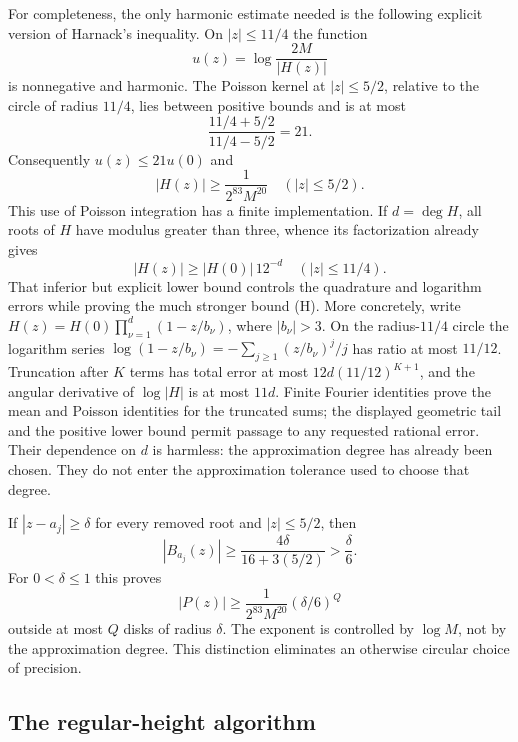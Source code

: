For completeness, the only harmonic estimate needed is the following
explicit version of Harnack's inequality.  On $|z|\le11/4$ the function
\[
 u(z)=\log\frac{2M}{|H(z)|}
\]
is nonnegative and harmonic.  The Poisson kernel at $|z|\le5/2$, relative to
the circle of radius $11/4$, lies between positive bounds and is at most
\[
 \frac{11/4+5/2}{11/4-5/2}=21.
\]
Consequently $u(z)\le21u(0)$ and
\[
 |H(z)|\ge \frac{1}{2^{83}M^{20}}\quad(|z|\le5/2).       \tag{H}
\]
This use of Poisson integration has a finite implementation.  If $d=\deg H$,
all roots of $H$ have modulus greater than three, whence its factorization
already gives
\[
 |H(z)|\ge |H(0)|\,12^{-d}\quad (|z|\le11/4).
\]
That inferior but explicit lower bound controls the quadrature and logarithm
errors while proving the much stronger bound (H).  More concretely, write
$H(z)=H(0)\prod_{\nu=1}^d(1-z/b_\nu)$, where $|b_\nu|>3$.
On the radius-$11/4$ circle the logarithm series
$\log(1-z/b_\nu)=-\sum_{j\ge1}(z/b_\nu)^j/j$ has ratio at most $11/12$.
Truncation after $K$ terms has total error at most
$12d(11/12)^{K+1}$, and the angular derivative of $\log|H|$ is at most
$11d$.  Finite Fourier identities prove the mean and Poisson identities
for the truncated sums; the displayed geometric tail and the positive
lower bound permit passage to any requested rational error.
Their dependence on $d$ is harmless: the approximation degree has already
been chosen.  They do not enter the approximation tolerance used to choose
that degree.

If $|z-a_j|\ge\delta$ for every removed root and $|z|\le5/2$, then
\[
 |B_{a_j}(z)|\ge\frac{4\delta}{16+3(5/2)}>\frac\delta6.
\]
For $0<\delta\le1$ this proves
\[
 |P(z)|\ge \frac{1}{2^{83}M^{20}}(\delta/6)^Q
                                                        \tag{MM}
\]
outside at most $Q$ disks of radius $\delta$.  The exponent is controlled by
$\log M$, not by the approximation degree.  This distinction eliminates
an otherwise circular choice of precision.

\subsection{The regular-height algorithm}


